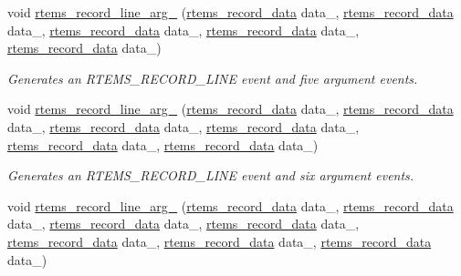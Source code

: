 \begin{DoxyCompactItemize}
void \mbox{\hyperlink{group__RTEMSRecord_ga667b80069071f1eb1e03979a680600d5}{rtems\+\_\+record\+\_\+line\+\_\+arg\+\_}} (\mbox{\hyperlink{group__RTEMSRecord_gab483bd3ec735835dac6788b78c817eab}{rtems\+\_\+record\+\_\+data}} data\+\_, \mbox{\hyperlink{group__RTEMSRecord_gab483bd3ec735835dac6788b78c817eab}{rtems\+\_\+record\+\_\+data}} data\+\_, \mbox{\hyperlink{group__RTEMSRecord_gab483bd3ec735835dac6788b78c817eab}{rtems\+\_\+record\+\_\+data}} data\+\_, \mbox{\hyperlink{group__RTEMSRecord_gab483bd3ec735835dac6788b78c817eab}{rtems\+\_\+record\+\_\+data}} data\+\_, \mbox{\hyperlink{group__RTEMSRecord_gab483bd3ec735835dac6788b78c817eab}{rtems\+\_\+record\+\_\+data}} data\+\_)
\begin{DoxyCompactList}\small\item\em Generates an R\+T\+E\+M\+S\+\_\+\+R\+E\+C\+O\+R\+D\+\_\+\+L\+I\+NE event and five argument events. \end{DoxyCompactList}\item 
void \mbox{\hyperlink{group__RTEMSRecord_ga442b9273fa2ee5fce152ef9cf24dcbf9}{rtems\+\_\+record\+\_\+line\+\_\+arg\+\_}} (\mbox{\hyperlink{group__RTEMSRecord_gab483bd3ec735835dac6788b78c817eab}{rtems\+\_\+record\+\_\+data}} data\+\_, \mbox{\hyperlink{group__RTEMSRecord_gab483bd3ec735835dac6788b78c817eab}{rtems\+\_\+record\+\_\+data}} data\+\_, \mbox{\hyperlink{group__RTEMSRecord_gab483bd3ec735835dac6788b78c817eab}{rtems\+\_\+record\+\_\+data}} data\+\_, \mbox{\hyperlink{group__RTEMSRecord_gab483bd3ec735835dac6788b78c817eab}{rtems\+\_\+record\+\_\+data}} data\+\_, \mbox{\hyperlink{group__RTEMSRecord_gab483bd3ec735835dac6788b78c817eab}{rtems\+\_\+record\+\_\+data}} data\+\_, \mbox{\hyperlink{group__RTEMSRecord_gab483bd3ec735835dac6788b78c817eab}{rtems\+\_\+record\+\_\+data}} data\+\_)
\begin{DoxyCompactList}\small\item\em Generates an R\+T\+E\+M\+S\+\_\+\+R\+E\+C\+O\+R\+D\+\_\+\+L\+I\+NE event and six argument events. \end{DoxyCompactList}\item 
void \mbox{\hyperlink{group__RTEMSRecord_gaec1bd9c0d07df7237df2ae660dae2ae7}{rtems\+\_\+record\+\_\+line\+\_\+arg\+\_}} (\mbox{\hyperlink{group__RTEMSRecord_gab483bd3ec735835dac6788b78c817eab}{rtems\+\_\+record\+\_\+data}} data\+\_, \mbox{\hyperlink{group__RTEMSRecord_gab483bd3ec735835dac6788b78c817eab}{rtems\+\_\+record\+\_\+data}} data\+\_, \mbox{\hyperlink{group__RTEMSRecord_gab483bd3ec735835dac6788b78c817eab}{rtems\+\_\+record\+\_\+data}} data\+\_, \mbox{\hyperlink{group__RTEMSRecord_gab483bd3ec735835dac6788b78c817eab}{rtems\+\_\+record\+\_\+data}} data\+\_, \mbox{\hyperlink{group__RTEMSRecord_gab483bd3ec735835dac6788b78c817eab}{rtems\+\_\+record\+\_\+data}} data\+\_, \mbox{\hyperlink{group__RTEMSRecord_gab483bd3ec735835dac6788b78c817eab}{rtems\+\_\+record\+\_\+data}} data\+\_, \mbox{\hyperlink{group__RTEMSRecord_gab483bd3ec735835dac6788b78c817eab}{rtems\+\_\+record\+\_\+data}} data\+\_)

\end{DoxyCompactItemize}
